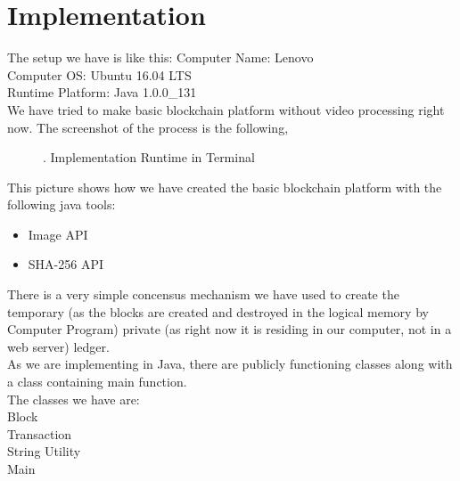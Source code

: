 \documentclass[a4paper,12pt]{report}
\begin{document}
\chapter{Implementation}
\label{Ch5} \setcounter{page}{1} 
\bigskip

The setup we have is like this:
Computer Name: Lenovo \\
Computer OS: Ubuntu 16.04 LTS \\
Runtime Platform: Java 1.0.0\_131 \\

We have tried to make basic blockchain platform without video processing right now. The screenshot of the process is the following,
\begin{figure}[!htb]
\caption{\label{fig:my-label}. Implementation Runtime in Terminal}
\end{figure}
This picture shows how we have created the basic blockchain platform with the following java tools:
\begin{itemize}
\item Image API
\item SHA-256 API
\end{itemize}
There is a very simple concensus mechanism we have used to create the temporary (as the blocks are created and destroyed in the logical memory by Computer Program) private (as right now it is residing in our computer, not in a web server) ledger.\\

As we are implementing in Java, there are publicly functioning classes along with a class containing main function.\\
The classes we have are:\\
	Block\\
	Transaction\\
	String Utility\\
	Main\\
\end{document}
